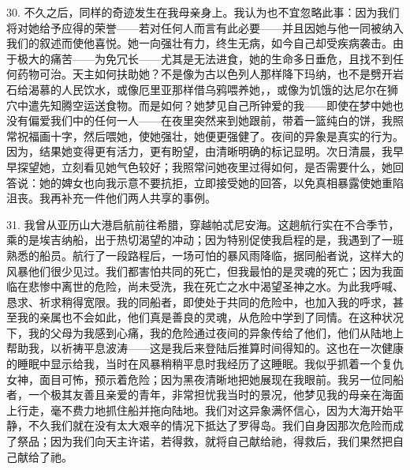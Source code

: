 30. 不久之后，同样的奇迹发生在我母亲身上。我认为也不宜忽略此事：因为我们将对她给予应得的荣誉——若对任何人而言有此必要——并且因她与他一同被纳入我们的叙述而使他喜悦。她一向强壮有力，终生无病，如今自己却受疾病袭击。由于极大的痛苦——为免冗长——尤其是无法进食，她的生命多日垂危，且找不到任何药物可治。天主如何扶助她？不是像为古以色列人那样降下玛纳，也不是劈开岩石给渴慕的人民饮水，或像厄里亚那样借乌鸦喂养她，，或像为饥饿的达尼尔在狮穴中遣先知腾空运送食物。而是如何？她梦见自己所钟爱的我——即使在梦中她也没有偏爱我们中的任何一人——在夜里突然来到她跟前，带着一篮纯白的饼，我照常祝福画十字，然后喂她，使她强壮，她便更强健了。夜间的异象是真实的行为。因为，结果她变得更有活力，更有盼望，由清晰明确的标记显明。次日清晨，我早早探望她，立刻看见她气色较好；我照常问她夜里过得如何，是否需要什么，她回答说：她的婢女也向我示意不要抗拒，立即接受她的回答，以免真相暴露使她重陷沮丧。我再补充一件他们两人共享的事例。\par

31. 我曾从亚历山大港启航前往希腊，穿越帕忒尼安海。这趟航行实在不合季节，乘的是埃吉纳船，出于热切渴望的冲动；因为特别促使我启程的是，我遇到了一班熟悉的船员。航行了一段路程后，一场可怕的暴风雨降临，据同船者说，这样大的风暴他们很少见过。我们都害怕共同的死亡，但我最怕的是灵魂的死亡；因为我面临在悲惨中离世的危险，尚未受洗，我在死亡之水中渴望圣神之水。为此我呼喊、恳求、祈求稍得宽限。我的同船者，即使处于共同的危险中，也加入我的呼求，甚至我的亲属也不会如此，他们真是善良的灵魂，从危险中学到了同情。在这种状况下，我的父母为我感到心痛，我的危险通过夜间的异象传给了他们，他们从陆地上帮助我，以祈祷平息波涛——这是我后来登陆后推算时间得知的。这也在一次健康的睡眠中显示给我，当时在风暴稍稍平息时我经历了这睡眠。我似乎抓着一个复仇女神，面目可怖，预示着危险；因为黑夜清晰地把她展现在我眼前。我另一位同船者，一个极其友善且亲爱的青年，非常担忧我当时的景况，他梦见我的母亲在海面上行走，毫不费力地抓住船并拖向陆地。我们对这异象满怀信心，因为大海开始平静，不久我们就在没有太大艰辛的情况下抵达了罗得岛。我们自身因那次危险而成了祭品；因为我们向天主许诺，若得救，就将自己献给祂，得救后，我们果然把自己献给了祂。\par


